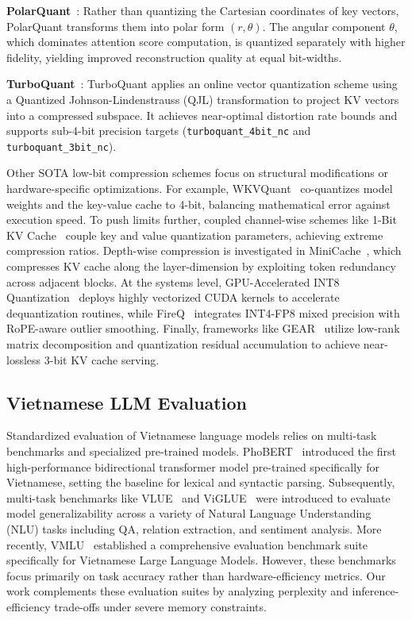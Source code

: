 \documentclass[10pt,twocolumn]{article}
\begin{document}
\noindent\textbf{PolarQuant}~\cite{wu2025polarquant,han2025polarquant}:
Rather than quantizing the Cartesian coordinates of key vectors,
PolarQuant transforms them into polar form $(r, \theta)$.
The angular component $\theta$, which dominates attention score
computation, is quantized separately with higher fidelity,
yielding improved reconstruction quality at equal bit-widths.

\noindent\textbf{TurboQuant}~\cite{Zandieh2025TurboQuant}:
TurboQuant applies an online vector quantization scheme using
a Quantized Johnson-Lindenstrauss (QJL) transformation to
project KV vectors into a compressed subspace.
It achieves near-optimal distortion rate bounds and supports
sub-4-bit precision targets (\texttt{turboquant\_4bit\_nc}
and \texttt{turboquant\_3bit\_nc}).

Other SOTA low-bit compression schemes focus on structural modifications
or hardware-specific optimizations.
For example, WKVQuant~\cite{Yue2024WKVQuant} co-quantizes model weights
and the key-value cache to 4-bit, balancing mathematical error against execution speed.
To push limits further, coupled channel-wise schemes like 1-Bit KV Cache~\cite{Zhang2024KV}
couple key and value quantization parameters, achieving extreme compression ratios.
Depth-wise compression is investigated in MiniCache~\cite{Liu2024MiniCache}, which compresses
KV cache along the layer-dimension by exploiting token redundancy across adjacent blocks.
At the systems level, GPU-Accelerated INT8 Quantization~\cite{Taneja2026GPUAccelerated}
deploys highly vectorized CUDA kernels to accelerate dequantization routines, while
FireQ~\cite{Baek2025FireQ} integrates INT4-FP8 mixed precision with RoPE-aware outlier smoothing.
Finally, frameworks like GEAR~\cite{Kang2024GEAR} utilize low-rank matrix decomposition
and quantization residual accumulation to achieve near-lossless 3-bit KV cache serving.

\subsection{Vietnamese LLM Evaluation}

Standardized evaluation of Vietnamese language models relies on multi-task
benchmarks and specialized pre-trained models.
PhoBERT~\cite{Nguyen2020PhoBERT} introduced the first high-performance
bidirectional transformer model pre-trained specifically for Vietnamese,
setting the baseline for lexical and syntactic parsing.
Subsequently, multi-task benchmarks like VLUE~\cite{NguyenThuan2024VLUE}
and ViGLUE~\cite{Tran2024ViGLUE} were introduced to evaluate model generalizability
across a variety of Natural Language Understanding (NLU) tasks including QA,
relation extraction, and sentiment analysis.
More recently, VMLU~\cite{bui-etal-2025-vmlu} established a comprehensive
evaluation benchmark suite specifically for Vietnamese Large Language Models.
However, these benchmarks focus primarily on task accuracy rather than hardware-efficiency
metrics.
Our work complements these evaluation suites by analyzing perplexity and
inference-efficiency trade-offs under severe memory constraints.
\end{document}
